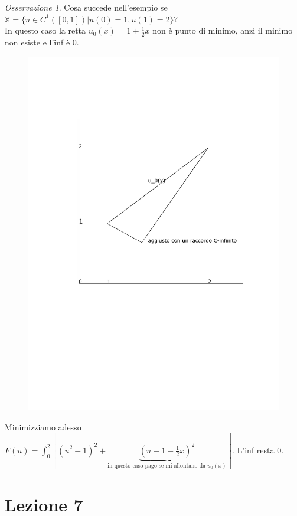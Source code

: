 \documentclass[a4paper]{book}
\theoremstyle{definition}
\theoremstyle{remark}
\newtheorem{oss}{Osservazione}
\theoremstyle{definition}
\newcommand{\bbx}{\mathbb{X}}
\begin{document}
\begin{oss}
Cosa succede nell'esempio se $\bbx = \{ u \in C^1([0,1])| u(0)=1, u(1)=2\}$?\\
In questo caso la retta $u_0(x) = 1 + \frac12 x$ non è punto di minimo, anzi il minimo non esiste e l'inf è 0.\\
\begin{figure}[h]
\centering
\includegraphics[scale=0.3]{capitolo6.pdf}
\end{figure}
\end{oss}

Minimizziamo adesso $F(u) = \int_{0}^{2}[(\dot{u}^2-1)^2 + \underbrace{(u-1-\frac12 x)^2}_{\text{in questo caso pago se mi allontano da $u_0(x)$}}]$. L'inf resta 0.

\chapter{Lezione 7}
\end{document}
